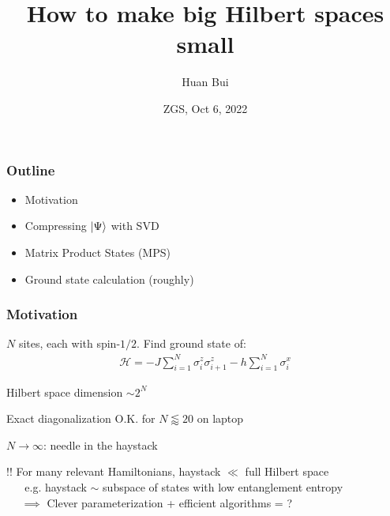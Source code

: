 \documentclass{beamer}
\title[\textcolor{white}{{}}]
{
	How to make big Hilbert spaces small
}
\author[Bui] %
{Huan Bui}
\institute[MIT]{} %
\date{ZGS, Oct 6, 2022}
\theoremstyle{definition}
\begin{document}
 
\frame{\titlepage}

\begin{frame}
	\frametitle{Outline}
	\begin{itemize}
		\item Motivation
		\item Compressing $\ket{\Psi}$ with SVD
		\item Matrix Product States (MPS)
		\item Ground state calculation (roughly)
	\end{itemize}
\end{frame}


\begin{frame}
	\frametitle{Motivation}
	
	$N$ sites, each with spin-$1/2$. Find ground state of:
	\begin{align*}
		\mathcal{H} = - J \sum_{i=1}^N \sigma_i^z \sigma_{i+1}^z - h \sum_{i=1}^N \sigma^x_i
	\end{align*}	
	
	
	Hilbert space dimension $\sim 2^N$\\
	
	\vspace{10pt}
	
	Exact diagonalization O.K. for $N \lessapprox 20$ on laptop\\
	
	\vspace{10pt}
	
	$N \to \infty$: needle in the haystack\\
	
	\vspace{10pt}
	
	\pause
	
	{$\boxed{!!}$ For many relevant Hamiltonians, haystack $\ll$ full Hilbert space }\\
	\vspace{5pt}
	{$\quad\,\,\,\,$e.g. haystack $\sim$ subspace of states with low entanglement entropy }\\
	\vspace{5pt}
	{$\quad\,\,\implies$ Clever parameterization + efficient algorithms = \smiley{}?}
	
		
	
\end{frame}
\end{document}
